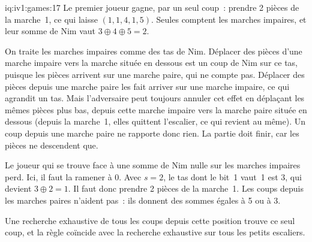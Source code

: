 \begin{solution}{iq:iv1:games:17}
Le premier joueur gagne, par un seul coup~: prendre 2 pièces de la marche~1, ce qui laisse $(1, 1, 4, 1, 5)$. Seules comptent les marches impaires, et leur somme de Nim vaut $3 \oplus 4 \oplus 5 = 2$.

On traite les marches impaires comme des tas de Nim. Déplacer des pièces d'une marche impaire vers la marche située en dessous est un coup de Nim sur ce tas, puisque les pièces arrivent sur une marche paire, qui ne compte pas. Déplacer des pièces depuis une marche paire les fait arriver sur une marche impaire, ce qui agrandit un tas. Mais l'adversaire peut toujours annuler cet effet en déplaçant les mêmes pièces plus bas, depuis cette marche impaire vers la marche paire située en dessous (depuis la marche~1, elles quittent l'escalier, ce qui revient au même). Un coup depuis une marche paire ne rapporte donc rien. La partie doit finir, car les pièces ne descendent que.

Le joueur qui se trouve face à une somme de Nim nulle sur les marches impaires perd. Ici, il faut la ramener à 0. Avec $s = 2$, le tas dont le bit~1 vaut~1 est 3, qui devient $3 \oplus 2 = 1$. Il faut donc prendre 2 pièces de la marche~1. Les coups depuis les marches paires n'aident pas~: ils donnent des sommes égales à 5 ou à 3.

Une recherche exhaustive de tous les coups depuis cette position trouve ce seul coup, et la règle coïncide avec la recherche exhaustive sur tous les petits escaliers.

\end{solution}

